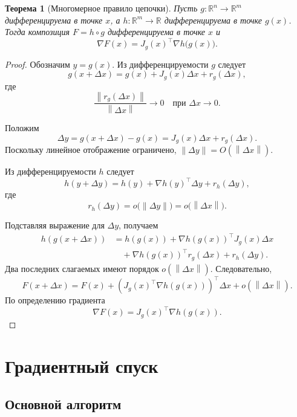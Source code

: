 \documentclass[12pt,a4paper]{article}
\theoremstyle{plain}
\newtheorem{theorem}{Теорема}[section]
\theoremstyle{definition}
\theoremstyle{remark}
\newcommand{\R}{\mathbb{R}}
\newcommand{\norm}[1]{\left\lVert #1 \right\rVert}
\begin{document}
\begin{theorem}[Многомерное правило цепочки]
Пусть $g\colon\R^n\to\R^m$ дифференцируема в точке $x$, а
$h\colon\R^m\to\R$ дифференцируема в точке $g(x)$. Тогда композиция
$F=h\circ g$ дифференцируема в точке $x$ и
\[
    \nabla F(x)
    =
    J_g(x)^\top
    \nabla h\bigl(g(x)\bigr).
\]
\end{theorem}

\begin{proof}
Обозначим $y=g(x)$. Из дифференцируемости $g$ следует
\[
    g(x+\Delta x)
    =
    g(x)
    +
    J_g(x)\Delta x
    +
    r_g(\Delta x),
\]
где
\[
    \frac{\norm{r_g(\Delta x)}}{\norm{\Delta x}}
    \longrightarrow 0
    \quad
    \text{при }
    \Delta x\to 0.
\]

Положим
\[
    \Delta y
    =
    g(x+\Delta x)-g(x)
    =
    J_g(x)\Delta x+r_g(\Delta x).
\]
Поскольку линейное отображение ограничено,
$\norm{\Delta y}=O(\norm{\Delta x})$.

Из дифференцируемости $h$ следует
\[
    h(y+\Delta y)
    =
    h(y)
    +
    \nabla h(y)^\top\Delta y
    +
    r_h(\Delta y),
\]
где
\[
    r_h(\Delta y)
    =
    o\bigl(\norm{\Delta y}\bigr)
    =
    o\bigl(\norm{\Delta x}\bigr).
\]

Подставляя выражение для $\Delta y$, получаем
\[
\begin{aligned}
    h(g(x+\Delta x))
    &=
    h(g(x))
    +
    \nabla h(g(x))^\top
    J_g(x)\Delta x\\
    &\quad+
    \nabla h(g(x))^\top r_g(\Delta x)
    +
    r_h(\Delta y).
\end{aligned}
\]
Два последних слагаемых имеют порядок
$o(\norm{\Delta x})$. Следовательно,
\[
    F(x+\Delta x)
    =
    F(x)
    +
    \left(
        J_g(x)^\top\nabla h(g(x))
    \right)^\top
    \Delta x
    +
    o(\norm{\Delta x}).
\]
По определению градиента
\[
    \nabla F(x)
    =
    J_g(x)^\top\nabla h(g(x)).
\]
\end{proof}

\section{Градиентный спуск}

\subsection{Основной алгоритм}
\end{document}
